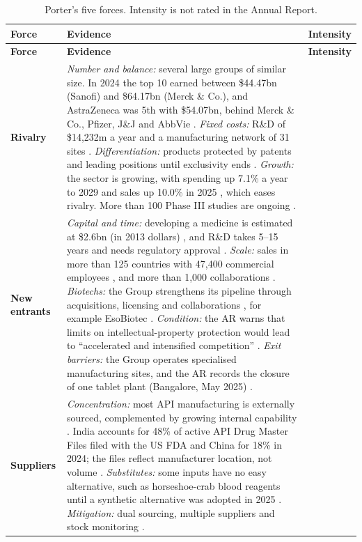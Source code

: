 \begin{xltabular}{\linewidth}{@{}N{2.5cm}Yp{2.3cm}@{}}
\caption{Porter's five forces. Intensity is not rated in the Annual Report.}\label{tab:porter}\\*
\toprule
\textbf{Force} & \textbf{Evidence} & \textbf{Intensity} \\*
\midrule
\endfirsthead
\toprule
\textbf{Force} & \textbf{Evidence} & \textbf{Intensity} \\*
\midrule
\endhead
\bottomrule
\endfoot
\textbf{Rivalry} & \textit{Number and balance:} several large groups of similar size. In 2024 the top 10 earned between \$44.47bn (Sanofi) and \$64.17bn (Merck \& Co.), and AstraZeneca was 5th with \$54.07bn, behind Merck \& Co., Pfizer, J\&J and AbbVie \cite{P50}. \textit{Fixed costs:} R\&D of \$14,232m a year \cite[p.~55]{AR} and a manufacturing network of 31 sites \cite[p.~33]{AR}. \textit{Differentiation:} products protected by patents and leading positions until exclusivity ends \cite[pp.~9, 56]{AR}. \textit{Growth:} the sector is growing, with spending up 7.1\% a year to 2029 and sales up 10.0\% in 2025 \cite[p.~6]{AR}, which eases rivalry. More than 100 Phase III studies are ongoing \cite[p.~3]{AR}. &  \\
\textbf{New entrants} & \textit{Capital and time:} developing a medicine is estimated at \$2.6bn (in 2013 dollars) \cite{MULLARD}, and R\&D takes 5--15 years and needs regulatory approval \cite[p.~9]{AR}. \textit{Scale:} sales in more than 125 countries with 47,400 commercial employees \cite[p.~32]{AR}, and more than 1,000 collaborations \cite[p.~37]{AR}. \textit{Biotechs:} the Group strengthens its pipeline through acquisitions, licensing and collaborations \cite[p.~48]{AR}, for example EsoBiotec \cite[p.~37]{AR}. \textit{Condition:} the AR warns that limits on intellectual-property protection would lead to ``accelerated and intensified competition'' \cite[p.~49]{AR}. \textit{Exit barriers:} the Group operates specialised manufacturing sites, and the AR records the closure of one tablet plant (Bangalore, May 2025) \cite[p.~33]{AR}. &  \\
\textbf{Suppliers} & \textit{Concentration:} most API manufacturing is externally sourced, complemented by growing internal capability \cite[p.~33]{AR}. India accounts for 48\% of active API Drug Master Files filed with the US FDA and China for 18\% in 2024; the files reflect manufacturer location, not volume \cite{USP}. \textit{Substitutes:} some inputs have no easy alternative, such as horseshoe-crab blood reagents until a synthetic alternative was adopted in 2025 \cite[p.~45]{AR}. \textit{Mitigation:} dual sourcing, multiple suppliers and stock monitoring \cite[p.~48]{AR}. &  \\

\end{xltabular}

